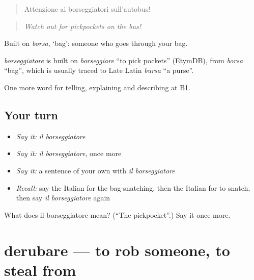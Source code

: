 \begin{quote}
Attenzione ai borseggiatori sull'autobus!
\end{quote}

\begin{quote}
\emph{Watch out for pickpockets on the bus!}
\end{quote}

Built on \emph{borsa}, ‘bag’: someone who goes through your bag.

\begin{cousinweb}
\emph{borseggiatore} is built on \emph{borseggiare} \textquotedblleft{}to pick pockets\textquotedblright{} (EtymDB), from \emph{borsa} \textquotedblleft{}bag\textquotedblright{}, which is usually traced to Late Latin \emph{bursa} \textquotedblleft{}a purse\textquotedblright{}.
\end{cousinweb}

\begin{grammarlens}[title={What you've built}]
One more word for telling, explaining and describing at B1.
\end{grammarlens}

\subsection*{Your turn}
\begin{itemize}
\raggedright
  \item \emph{Say it:} \emph{il borseggiatore}
  \item \emph{Say it:} \emph{il borseggiatore}, once more
  \item \emph{Say it:} a sentence of your own with \emph{il borseggiatore}
  \item \emph{Recall:} say the Italian for the bag-snatching, then the Italian for to snatch, then say \emph{il borseggiatore} again
\end{itemize}

\begin{tcolorbox}[breakable,colback=teal!4,colframe=teal!35!black,title={Before you move on}]
What does il borseggiatore mean? (\textquotedblleft{}The pickpocket\textquotedblright{}.) Say it once more.
\end{tcolorbox}
\section[derubare]{derubare — to rob someone, to steal from}

\label{lesson:IT-C291-derubare}



